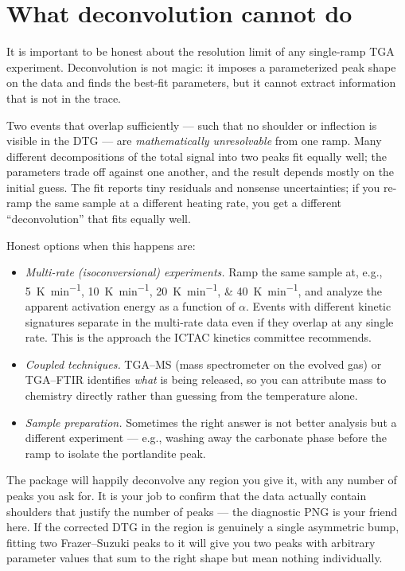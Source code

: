 \documentclass[11pt]{article}
\begin{document}
\section{What deconvolution cannot do}

It is important to be honest about the resolution limit of any
single-ramp TGA experiment. Deconvolution is not magic: it imposes a
parameterized peak shape on the data and finds the best-fit
parameters, but it cannot extract information that is not in the
trace.

Two events that overlap sufficiently --- such that no shoulder or
inflection is visible in the DTG --- are \emph{mathematically
unresolvable} from one ramp. Many different decompositions of the
total signal into two peaks fit equally well; the parameters trade
off against one another, and the result depends mostly on the initial
guess. The fit reports tiny residuals and nonsense uncertainties; if
you re-ramp the same sample at a different heating rate, you get a
different ``deconvolution'' that fits equally well.

Honest options when this happens are:

\begin{itemize}
  \item \emph{Multi-rate (isoconversional) experiments.} Ramp the same
        sample at, e.g., \qtylist{5;10;20;40}{\kelvin\per\minute},
        and analyze the apparent activation energy as a function of
        $\alpha$. Events with different kinetic signatures separate
        in the multi-rate data even if they overlap at any single
        rate. This is the approach the ICTAC kinetics committee
        recommends.
  \item \emph{Coupled techniques.} TGA--MS (mass spectrometer on the
        evolved gas) or TGA--FTIR identifies \emph{what} is being
        released, so you can attribute mass to chemistry directly
        rather than guessing from the temperature alone.
  \item \emph{Sample preparation.} Sometimes the right answer is not
        better analysis but a different experiment --- e.g., washing
        away the carbonate phase before the ramp to isolate the
        portlandite peak.
\end{itemize}

The package will happily deconvolve any region you give it, with any
number of peaks you ask for. It is your job to confirm that the data
actually contain shoulders that justify the number of peaks --- the
diagnostic PNG is your friend here. If the corrected DTG in the region
is genuinely a single asymmetric bump, fitting two Frazer--Suzuki
peaks to it will give you two peaks with arbitrary parameter values
that sum to the right shape but mean nothing individually.
\end{document}
